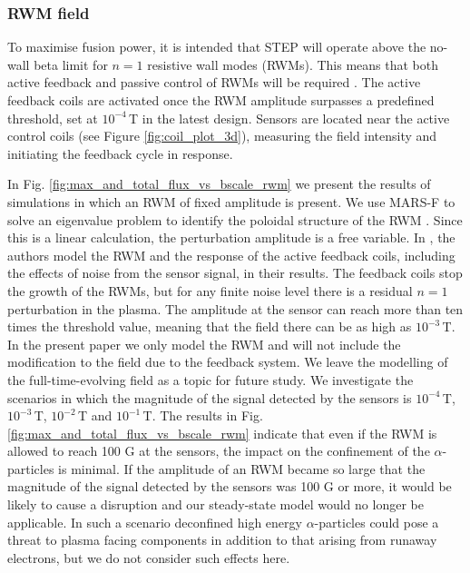 \documentclass[10pt, a4paper, twoside]{article}
\begin{document}
\newpage
\subsubsection{RWM field}
\label{sec:rwm_field}

To maximise fusion power, it is intended that STEP will operate above the no-wall beta limit for $n=1$ resistive wall modes (RWMs). This means that both active feedback and passive control of RWMs will be required \cite{xia2023}. The active feedback coils are activated once the RWM amplitude surpasses a predefined threshold, set at $10^{-4}\,$T in the latest design.
Sensors are located near the active control coils (see Figure \ref{fig:coil_plot_3d}), measuring the field intensity and initiating the feedback cycle in response.

In Fig. \ref{fig:max_and_total_flux_vs_bscale_rwm} we present the results of simulations in which an RWM of fixed amplitude is present. 
We use MARS-F to solve an eigenvalue problem to identify the poloidal structure of the RWM \cite{xia2023}. Since this is a linear calculation, the perturbation amplitude is a free variable.
In \cite{xia2023}, the authors model the RWM and the response of the active feedback coils, including the effects of noise from the sensor signal, in their results. The feedback coils stop the growth of the RWMs, but for any finite noise level there is a residual $n=1$ perturbation in the plasma. The amplitude at the sensor can reach more than ten times the threshold value, meaning that the field there can be as high as $10^{-3}\,$T. In the present paper we only model the RWM and will not include the modification to the field due to the feedback system. We leave the modelling of the full-time-evolving field as a topic for future study. We investigate the scenarios in which the magnitude of the signal detected by the sensors is $10^{-4}\,$T, $10^{-3}\,$T, $10^{-2}\,$T and $10^{-1}\,$T. The results in Fig. \ref{fig:max_and_total_flux_vs_bscale_rwm} indicate that even if the RWM is allowed to reach 100 G at the sensors, the impact on the confinement of the $\alpha$-particles is minimal. If the amplitude of an RWM became so large that the magnitude of the signal detected by the sensors was 100 G or more, it would be likely to cause a disruption and our steady-state model would no longer be applicable. In such a scenario deconfined high energy $\alpha$-particles could pose a threat to plasma facing components in addition to that arising from runaway electrons, but we do not consider such effects here. 
\end{document}
